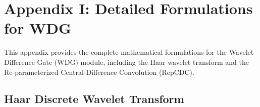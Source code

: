 \documentclass{article}
\theoremstyle{plain}
\theoremstyle{definition}
\theoremstyle{remark}
\begin{document}

\section{Appendix I: Detailed Formulations for WDG}
\label{sec:appendix_wdg_details}

This appendix provides the complete mathematical formulations for the Wavelet-Difference Gate (WDG) module, including the Haar wavelet transform and the Re-parameterized Central-Difference Convolution (RepCDC).

\subsection{Haar Discrete Wavelet Transform}
\end{document}
